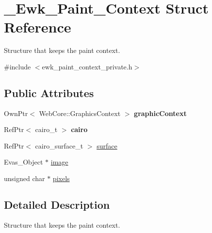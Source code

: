 \hypertarget{struct__Ewk__Paint__Context}{\section{\+\_\+\+Ewk\+\_\+\+Paint\+\_\+\+Context Struct Reference}
\label{struct__Ewk__Paint__Context}
}


Structure that keeps the paint context.  




{\ttfamily \#include $<$ewk\+\_\+paint\+\_\+context\+\_\+private.\+h$>$}

\subsection*{Public Attributes}
\begin{DoxyCompactItemize}
\item 
\hypertarget{struct__Ewk__Paint__Context_adcc3b42b5422758ec0e3dea2cf15ac1e}{Own\+Ptr$<$ Web\+Core\+::\+Graphics\+Context $>$ {\bfseries graphic\+Context}}\label{struct__Ewk__Paint__Context_adcc3b42b5422758ec0e3dea2cf15ac1e}

\item 
\hypertarget{struct__Ewk__Paint__Context_a5ac9311a8e490d9ec2ead5803abe6848}{Ref\+Ptr$<$ cairo\+\_\+t $>$ {\bfseries cairo}}\label{struct__Ewk__Paint__Context_a5ac9311a8e490d9ec2ead5803abe6848}

\item 
Ref\+Ptr$<$ cairo\+\_\+surface\+\_\+t $>$ \hyperlink{struct__Ewk__Paint__Context_a1bbb71864c0024919197996ff659083d}{surface}
\item 
Evas\+\_\+\+Object $\ast$ \hyperlink{struct__Ewk__Paint__Context_a7f357a577ca369bcb271e654cb59e62b}{image}
\item 
unsigned char $\ast$ \hyperlink{struct__Ewk__Paint__Context_aa7428ea356e9948321c1d1aad7fec59b}{pixels}
\end{DoxyCompactItemize}


\subsection{Detailed Description}
Structure that keeps the paint context. 

